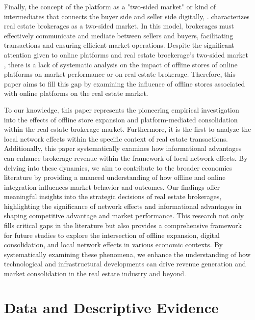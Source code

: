 \documentclass[11pt]{article}
\begin{document}
Finally, the concept of the platform as a "two-sided market" or kind of intermediates that connects the buyer side and seller side digitally, \citep{10.1162/154247603322493212, Langley_Leyshon_2017, 10.1257/aer.100.4.1642}. \citet{https://doi.org/10.1111/j.1756-2171.2006.tb00036.x} characterizes real estate brokerages as a two-sided market. In this model, brokerages must effectively communicate and mediate between sellers and buyers, facilitating transactions and ensuring efficient market operations. Despite the significant attention given to online platforms and real estate broekerage's two-sided market \citep{10.1257/jep.23.3.125}, there is a lack of systematic analysis on the impact of offline stores of online platforms on market performance or on real estate brokerage. Therefore, this paper aims to fill this gap by examining the influence of offline stores associated with online platforms on the real estate market.

To our knowledge, this paper represents the pioneering empirical investigation into the effects of offline store expansion and platform-mediated consolidation within the real estate brokerage market. Furthermore, it is the first to analyze the local network effects within the specific context of real estate transactions. Additionally, this paper systematically examines how informational advantages can enhance brokerage revenue within the framework of local network effects. By delving into these dynamics, we aim to contribute to the broader economics literature by providing a nuanced understanding of how offline and online integration influences market behavior and outcomes. Our findings offer meaningful insights into the strategic decisions of real estate brokerages, highlighting the significance of network effects and informational advantages in shaping competitive advantage and market performance. This research not only fills critical gaps in the literature but also provides a comprehensive framework for future studies to explore the intersection of offline expansion, digital consolidation, and local network effects in various economic contexts. By systematically examining these phenomena, we enhance the understanding of how technological and infrastructural developments can drive revenue generation and market consolidation in the real estate industry and beyond.

\section{Data and Descriptive Evidence \label{sec:data}}
\end{document}
